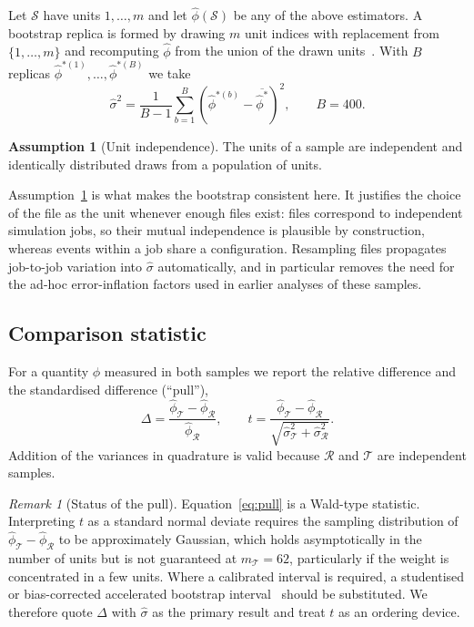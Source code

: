 \documentclass[11pt,a4paper]{article}
\theoremstyle{definition}
\newtheorem{assumption}{Assumption}[section]
\theoremstyle{plain}
\theoremstyle{remark}
\newtheorem{remark}{Remark}[section]
\newcommand{\Rr}{\mathcal{R}}
\newcommand{\Tt}{\mathcal{T}}
\begin{document}
Let $\mathcal{S}$ have units $1,\dots,m$ and let $\hat{\phi}(\mathcal{S})$ be
any of the above estimators. A bootstrap replica is formed by drawing $m$ unit
indices with replacement from $\{1,\dots,m\}$ and recomputing $\hat{\phi}$ from
the union of the drawn units~\cite{Efron1979,DavisonHinkley1997}. With $B$
replicas $\hat{\phi}^{*(1)},\dots,\hat{\phi}^{*(B)}$ we take
\begin{equation}
  \hat{\sigma}^{2}
  = \frac{1}{B-1}\sum_{b=1}^{B}
    \left(\hat{\phi}^{*(b)} - \overline{\hat{\phi}^{*}}\right)^{2},
  \qquad B = 400 .
\end{equation}

\begin{assumption}[Unit independence]
\label{ass:units}
The units of a sample are independent and identically distributed draws from a
population of units.
\end{assumption}

Assumption~\ref{ass:units} is what makes the bootstrap consistent here. It
justifies the choice of the file as the unit whenever enough files exist: files
correspond to independent simulation jobs, so their mutual independence is
plausible by construction, whereas events within a job share a configuration.
Resampling files propagates job-to-job variation into $\hat{\sigma}$
automatically, and in particular removes the need for the ad-hoc
error-inflation factors used in earlier analyses of these samples.

\subsection{Comparison statistic}

For a quantity $\phi$ measured in both samples we report the relative
difference and the standardised difference (``pull''),
\begin{equation}
  \Delta = \frac{\hat{\phi}_\Tt - \hat{\phi}_\Rr}{\hat{\phi}_\Rr},
  \qquad
  t = \frac{\hat{\phi}_\Tt - \hat{\phi}_\Rr}
           {\sqrt{\hat{\sigma}_\Tt^{2} + \hat{\sigma}_\Rr^{2}}} .
  \label{eq:pull}
\end{equation}
Addition of the variances in quadrature is valid because $\Rr$ and $\Tt$ are
independent samples.

\begin{remark}[Status of the pull]
\label{rem:pull}
Equation~\eqref{eq:pull} is a Wald-type statistic. Interpreting $t$ as a
standard normal deviate requires the sampling distribution of
$\hat{\phi}_\Tt - \hat{\phi}_\Rr$ to be approximately Gaussian, which holds
asymptotically in the number of units but is not guaranteed at $m_\Tt = 62$,
particularly if the weight is concentrated in a few units. Where a calibrated
interval is required, a studentised or bias-corrected accelerated bootstrap
interval~\cite{DavisonHinkley1997} should be substituted. We therefore quote
$\Delta$ with $\hat{\sigma}$ as the primary result and treat $t$ as an ordering
device.
\end{remark}
\end{document}
